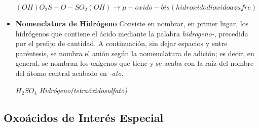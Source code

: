 \begin{itemize}
	\begin{center}
		$(OH)O_{2}S-O-SO_{2}(OH) \rightarrow \mu -oxido-bis(hidroxidodioxidoazufre)$
	\end{center}
	\item\textbf{Nomenclatura de Hidrógeno} Consiste en nombrar, en primer lugar, los hidrógenos que contiene el ácido mediante la palabra \emph{hidrogeno-}, precedida por el prefijo de cantidad. A continuación, sin dejar espacios y entre paréntesis, se nombra el anión según la nomenclatura de adición; es decir, en general, se nombran los oxígenos que tiene y se acaba con la raíz del nombre del átomo central acabado en \emph{-ato}.
	\begin{center}
		$H_{2}SO_{4}$ \textit{Hidrógeno(tetraóxidosulfato)}
	\end{center}
	
\end{itemize}

\subsection{Oxoácidos de Interés Especial}

